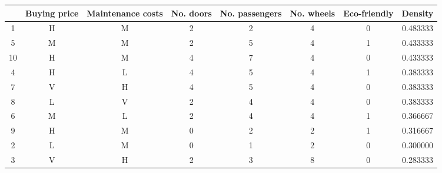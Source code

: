 \begin{tabular}{cccccccc}
\toprule
{} & Buying price & Maintenance costs &  No. doors &  No. passengers &  No. wheels &  Eco-friendly &   Density \\
\midrule
1  &            H &                 M &          2 &               2 &           4 &             0 &  0.483333 \\
5  &            M &                 M &          2 &               5 &           4 &             1 &  0.433333 \\
10 &            H &                 M &          4 &               7 &           4 &             0 &  0.433333 \\
4  &            H &                 L &          4 &               5 &           4 &             1 &  0.383333 \\
7  &            V &                 H &          4 &               5 &           4 &             0 &  0.383333 \\
8  &            L &                 V &          2 &               4 &           4 &             0 &  0.383333 \\
6  &            M &                 L &          2 &               4 &           4 &             1 &  0.366667 \\
9  &            H &                 M &          0 &               2 &           2 &             1 &  0.316667 \\
2  &            L &                 M &          0 &               1 &           2 &             0 &  0.300000 \\
3  &            V &                 H &          2 &               3 &           8 &             0 &  0.283333 \\
\bottomrule
\end{tabular}
